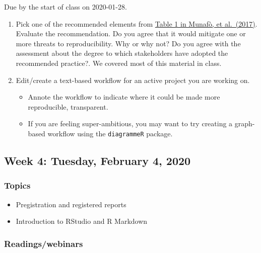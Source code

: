 \documentclass[
]{article}
\providecommand{\tightlist}{%
  \setlength{\itemsep}{0pt}\setlength{\parskip}{0pt}}
\begin{document}
Due by the start of class on 2020-01-28.

\begin{enumerate}
\def\labelenumi{\arabic{enumi}.}
\tightlist
\item
  Pick one of the recommended elements from
  \href{http://www.nature.com/articles/s41562-016-0021/tables/1}{Table 1
  in Munafò, et al.~(2017)}. Evaluate the recommendation. Do you agree
  that it would mitigate one or more threats to reproducibility. Why or
  why not? Do you agree with the assessment about the degree to which
  stakeholders have adopted the recommended practice?. We covered most
  of this material in class.
\item
  Edit/create a text-based workflow for an active project you are
  working on.

  \begin{itemize}
  \tightlist
  \item
    Annote the workflow to indicate where it could be made more
    reproducible, transparent.
  \item
    If you are feeling super-ambitious, you may want to try creating a
    graph-based workflow using the \texttt{diagrammeR} package.
  \end{itemize}
\end{enumerate}

\hypertarget{week-4-tuesday-february-4-2020}{%
\subsection{Week 4: Tuesday, February 4,
2020}\label{week-4-tuesday-february-4-2020}}

\hypertarget{topics-3}{%
\subsubsection{Topics}\label{topics-3}}

\begin{itemize}
\tightlist
\item
  Pregistration and registered reports
\item
  Introduction to RStudio and R Markdown
\end{itemize}

\hypertarget{readingswebinars-2}{%
\subsubsection{Readings/webinars}\label{readingswebinars-2}}
\end{document}
